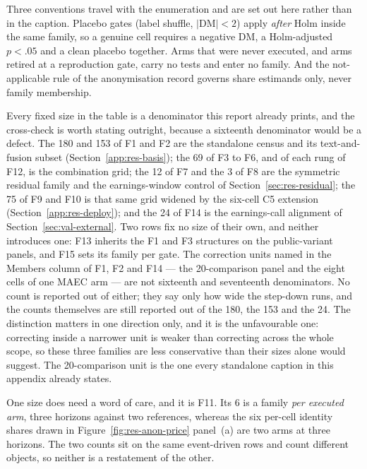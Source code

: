 Three conventions travel with the enumeration and are set out here rather
than in the caption. Placebo gates (label shuffle,
$|\mathrm{DM}| < 2$) apply \emph{after} Holm inside the same family, so a
genuine cell requires a negative DM, a Holm-adjusted $p < .05$ and a
clean placebo together. Arms that were never executed, and arms retired
at a reproduction gate, carry no tests and enter no family. And the
not-applicable rule of the anonymisation record governs share estimands
only, never family membership. %

Every fixed size in the table is a denominator this report already
prints, and the cross-check is worth stating outright, because a
sixteenth denominator would be a defect. The 180 and 153 of F1 and F2 are
the standalone census and its text-and-fusion subset
(Section~\ref{app:res-basis}); the 69 of F3 to F6, and of each rung of
F12, is the combination grid; the 12 of F7 and the 3 of F8 are the
symmetric residual family and the earnings-window control of
Section~\ref{sec:res-residual}; the 75 of F9 and F10 is that same grid
widened by the six-cell C5 extension (Section~\ref{app:res-deploy}); and
the 24 of F14 is the earnings-call alignment of
Section~\ref{sec:val-external}. %
Two rows fix no size of their own, and neither introduces one: F13
inherits the F1 and F3 structures on the public-variant panels, and F15
sets its family per gate.
The correction units named in the Members column of F1, F2 and F14 --- the
20-comparison panel and the eight cells of one MAEC arm --- are not
sixteenth and seventeenth denominators. No count is reported out of
either; they say only how wide the step-down runs, and the counts
themselves are still reported out of the 180, the 153 and the 24. The
distinction matters in one direction only, and it is the unfavourable one:
correcting inside a narrower unit is weaker than correcting across the
whole scope, so these three families are less conservative than their
sizes alone would suggest. The 20-comparison unit is the one every
standalone caption in this appendix already states.

One size does need a word of care, and it is F11. Its 6 is a family
\emph{per executed arm}, three horizons against two references, whereas
the six per-cell identity shares drawn in
Figure~\ref{fig:res-anon-price} panel~(a) are two arms at three horizons.
The two counts sit on the same event-driven rows and count different
objects, so neither is a restatement of the other. %

